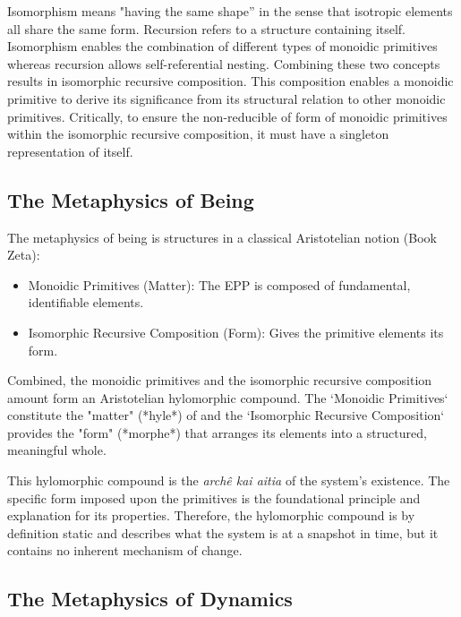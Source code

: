 Isomorphism means "having the same shape” in the sense that isotropic elements all share the same form. Recursion refers to a structure containing itself. Isomorphism enables the combination of different types of monoidic primitives whereas recursion allows self-referential nesting. Combining these two concepts results in isomorphic recursive composition. This composition enables a monoidic primitive to derive its significance from its structural relation to other monoidic primitives. Critically, to ensure the  non-reducible  of form of monoidic primitives within the isomorphic recursive composition, it  must have a singleton representation of itself. 

\subsection{The Metaphysics of Being} 
\label{sec:metaphysics_being}

The metaphysics of being is structures in a classical Aristotelian notion (Book Zeta\cite{furth1985metaphysics}): 

\begin{itemize}
	\item Monoidic Primitives (Matter): The EPP is composed of fundamental, identifiable elements.
	\item Isomorphic Recursive Composition (Form): Gives the primitive elements its form. 
\end{itemize}

Combined, the monoidic primitives and the isomorphic recursive composition amount form an Aristotelian hylomorphic compound. The `Monoidic Primitives` constitute the "matter" (*hyle*) of and the `Isomorphic Recursive Composition` provides the "form" (*morphe*) that arranges its elements into a structured, meaningful whole.

This hylomorphic compound is the  \textit{archê kai aitia} of the system's existence. The specific form imposed upon the primitives is the foundational principle and explanation for its properties. Therefore, the hylomorphic compound is by definition static and describes what the system is at a snapshot in time, but it contains no inherent mechanism of change. 

\newpage

\subsection{The Metaphysics of Dynamics} 
\label{sec:metaphysics_dynamics}

